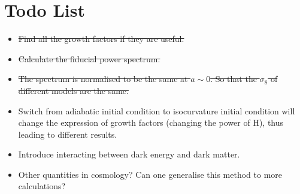 \documentclass{article}
\begin{document}
\section{Todo List}
\begin{itemize}
\item
\sout{Find all the growth factors if they are useful.}
\item
\sout{Calculate the fiducial power spectrum.}

\item
\sout{The spectrum is normalised to be the same at $a\sim 0$. So that the $\sigma_8$ of different models are the same.}

\item
Switch from adiabatic initial condition to isocurvature initial condition will change the expression of growth factors (changing the power of H), thus leading to different results.

\item
Introduce interacting between dark energy and dark matter.

\item
Other quantities in cosmology? Can one generalise this method to more calculations?


\end{itemize}














\end{document}
